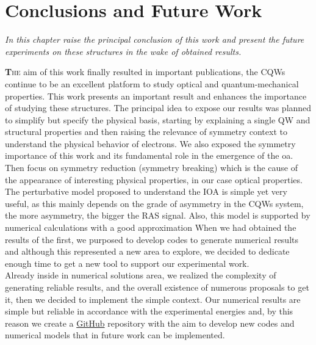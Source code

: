\chapter{Conclusions and Future Work }
\label{chap:Intro}
\textit{In this chapter raise the principal conclusion of this work and present the future experiments on these structures in the wake of obtained results.}
\vfill
\minitoc
\newpage
\allowdisplaybreaks


\lettrine[lines=3, lraise=.1, nindent=0mm, slope=0mm]{\textbf{T}}{he} aim of this work finally resulted in important publications, the CQWs continue to be an excellent platform to study optical and quantum-mechanical properties.
This work presents an important result and enhances the importance of studying these structures. The principal idea to expose our results was planned to simplify but specify the physical basis, starting by explaining a single QW and structural properties and then raising the relevance of symmetry context to understand the physical behavior of electrons.
We also exposed the symmetry importance of this work and its fundamental role in
the emergence of the \gls{oa}. Then focus on symmetry reduction (symmetry breaking) which is the cause of the appearance of interesting physical properties, in our case optical properties.
The perturbative model proposed to understand the IOA is simple yet very
useful, as this mainly depends on the grade of asymmetry in the CQWs system, the
more asymmetry, the bigger the RAS signal. Also, this model is supported by numerical
calculations with a good approximation
When we had obtained the results of the first, we purposed to develop codes to generate numerical results and although this represented a new area to explore, we decided to dedicate enough time to get a new tool to support our experimental work.\\
Already inside in numerical solutions area, we realized the complexity of generating reliable
results, and the overall existence of numerous proposals to get it, then we decided to implement the simple context. Our numerical results are simple but reliable in accordance with the experimental energies and, by this reason we create a  \href{https://github.com/lflmgroup}{GitHub} repository \cite{lflmgroup} with the aim to develop new codes and numerical models that in future work can be implemented.



